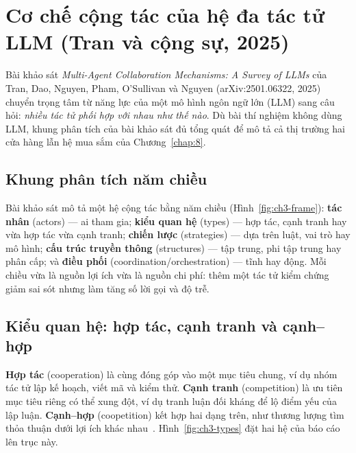 \chapter{Cơ chế cộng tác của hệ đa tác tử LLM (Tran và cộng sự, 2025)}\label{chap:3}

Bài khảo sát \emph{Multi-Agent Collaboration Mechanisms: A Survey of LLMs} của Tran, Dao, Nguyen, Pham,
O'Sullivan và Nguyen (arXiv:2501.06322, 2025)~\cite{ch3:tran} chuyển trọng tâm từ năng lực của một mô hình ngôn
ngữ lớn (LLM) sang câu hỏi: \emph{nhiều tác tử phối hợp với nhau như thế nào}. Dù bài thí nghiệm không dùng LLM,
khung phân tích của bài khảo sát đủ tổng quát để mô tả cả thị trường hai cửa hàng lẫn hệ mua sắm của Chương~\ref{chap:8}.

\section{Khung phân tích năm chiều}

Bài khảo sát mô tả một hệ cộng tác bằng năm chiều (Hình~\ref{fig:ch3-frame}): \textbf{tác nhân} (actors) --- ai
tham gia; \textbf{kiểu quan hệ} (types) --- hợp tác, cạnh tranh hay vừa hợp tác vừa cạnh tranh;
\textbf{chiến lược} (strategies) --- dựa trên luật, vai trò hay mô hình; \textbf{cấu trúc truyền thông}
(structures) --- tập trung, phi tập trung hay phân cấp; và \textbf{điều phối} (coordination/orchestration) --- tĩnh
hay động. Mỗi chiều vừa là nguồn lợi ích vừa là nguồn chi phí: thêm một tác tử kiểm chứng giảm sai sót nhưng làm
tăng số lời gọi và độ trễ.



\section{Kiểu quan hệ: hợp tác, cạnh tranh và cạnh--hợp}

\textbf{Hợp tác} (cooperation) là cùng đóng góp vào một mục tiêu chung, ví dụ nhóm tác tử lập kế hoạch, viết mã và
kiểm thử. \textbf{Cạnh tranh} (competition) là ưu tiên mục tiêu riêng có thể xung đột, ví dụ tranh luận đối kháng để
lộ điểm yếu của lập luận. \textbf{Cạnh--hợp} (coopetition) kết hợp hai dạng trên, như thương lượng tìm thỏa thuận
dưới lợi ích khác nhau~\cite{ch3:tran}. Hình~\ref{fig:ch3-types} đặt hai hệ của báo cáo lên trục này.

